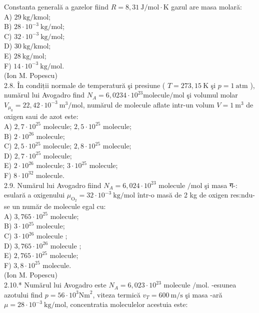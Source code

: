 \documentclass[10pt]{article}
\begin{document}
Constanta generală a gazelor fiind $R=8,31 \mathrm{~J} / \mathrm{mol} \cdot \mathrm{K}$ gazul are masa molară:\\
A) $29 \mathrm{~kg} / \mathrm{kmol}$;\\
B) $28 \cdot 10^{-3} \mathrm{~kg} / \mathrm{mol}$;\\
C) $32 \cdot 10^{-3} \mathrm{~kg} / \mathrm{mol}$;\\
D) $30 \mathrm{~kg} / \mathrm{kmol}$;\\
E) $28 \mathrm{~kg} / \mathrm{mol}$;\\
F) $14 \cdot 10^{-3} \mathrm{~kg} / \mathrm{mol}$.\\
(Ion M. Popescu)\\
2.8. În condiții normale de temperatură şi presiune ( $T=273,15 \mathrm{~K}$ şi $p=1 \mathrm{~atm}$ ), numărul lui Avogadro find $N_{A}=6,0234 \cdot 10^{23} \mathrm{molecule} / \mathrm{mol}$ şi volumul molar $V_{\mu_{0}}=22,42 \cdot 10^{-3} \mathrm{~m}^{3} / \mathrm{mol}$, numărul de molecule aflate intr-un volum $V=1 \mathrm{~m}^{3}$ de oxigen saui de azot este:\\
A) $2,7 \cdot 10^{25}$ molecule; $2,5 \cdot 10^{25}$ molecule;\\
B) $2 \cdot 10^{26}$ molecule;\\
C) $2,5 \cdot 10^{25}$ molecule; $2,8 \cdot 10^{25}$ molecule;\\
D) $2,7 \cdot 10^{25}$ molecule;\\
E) $2 \cdot 10^{26}$ molecule; $3 \cdot 10^{25}$ molecule;\\
F) $8 \cdot 10^{32}$ molecule.\\
2.9. Numărul lui Avogadro fiind $N_{A}=6,024 \cdot 10^{23}$ molecule $/ \mathrm{mol}$ şi masa ग-: esulară a oxigenului $\mu_{\mathrm{O}_{2}}=32 \cdot 10^{-3} \mathrm{~kg} / \mathrm{mol}$ într-o masă de 2 kg de oxigen res:ndu-se un număr de molecule egal cu:\\
A) $3,765 \cdot 10^{25}$ molecule;\\
B) $3 \cdot 10^{25}$ molecule;\\
C) $3 \cdot 10^{26}$ molecule ;\\
D) $3,765 \cdot 10^{26}$ molecule ;\\
E) $2,765 \cdot 10^{25}$ molecule;\\
F) $3,8 \cdot 10^{25}$ molecule.\\
(Ion M. Popescu)\\
2.10.* Numărul lui Avogadro este $N_{A}=6,023 \cdot 10^{23}$ molecule $/ \mathrm{mol}$. -esıunea azotului find $p=56 \cdot 10^{3} \mathrm{Nm}^{2}$, viteza termică $v_{T}=600 \mathrm{~m} / \mathrm{s}$ şi masa -ară $\mu=28 \cdot 10^{-3} \mathrm{~kg} / \mathrm{mol}$, concentratia moleculelor acestuia este:\\
\end{document}
